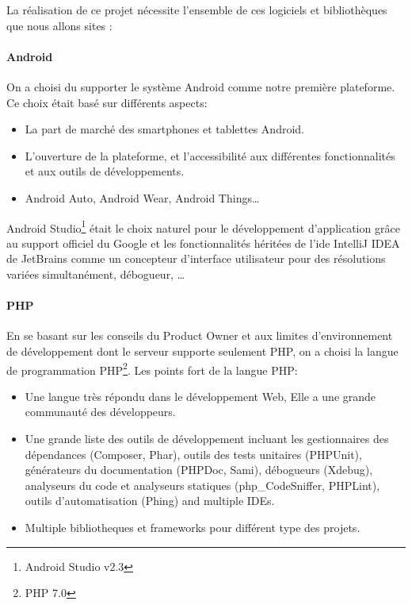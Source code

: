 La réalisation de ce projet nécessite l'ensemble de ces logiciels et
bibliothèques que nous allons sites :

\paragraph{Android}

On a choisi du supporter le système Android comme notre première plateforme. Ce
choix était basé sur différents aspects:
\begin{itemize}
    \item La part de marché des smartphones et tablettes Android.
    \item L'ouverture de la plateforme, et l'accessibilité aux différentes
        fonctionnalités et aux outils de développements.
    \item Android Auto, Android Wear, Android Things\ldots
\end{itemize}

Android Studio\footnote{Android Studio v2.3} était le choix naturel pour le
développement d'application grâce au support officiel du Google et les
fonctionnalités héritées de l'ide IntelliJ IDEA de JetBrains comme un
concepteur d’interface utilisateur pour des résolutions variées simultanément,
débogueur, \ldots


\paragraph{PHP}
En se basant sur les conseils du Product Owner et aux limites d'environnement
de développement dont le serveur supporte seulement PHP, on a choisi la langue
de programmation PHP\footnote{PHP 7.0}.
Les points fort de la langue PHP:
\begin{itemize}
    \item Une langue très répondu dans le développement Web, Elle a une
        grande communauté des développeurs.
    \item Une grande liste des outils de développement incluant les
        gestionnaires des dépendances (Composer, Phar), outils des tests
        unitaires (PHPUnit), générateurs du documentation (PHPDoc, Sami),
        débogueurs (Xdebug), analyseurs du code et analyseurs statiques
        (php\_CodeSniffer, PHPLint), outils d'automatisation (Phing) and
        multiple IDEs.
    \item Multiple bibliotheques et frameworks pour différent type des projets.
\end{itemize}

